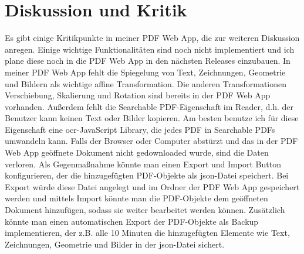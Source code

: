 \chapter{Diskussion und Kritik}
Es gibt einige Kritikpunkte in meiner PDF Web App, die zur weiteren Diskussion anregen. Einige wichtige Funktionalitäten sind noch nicht implementiert und ich plane diese noch in die PDF Web App in den nächsten Releases einzubauen. In meiner PDF Web App fehlt die Spiegelung von Text, Zeichnungen, Geometrie und Bildern als wichtige affine Transformation. Die anderen Transformationen Verschiebung, Skalierung und Rotation sind bereits in der PDF Web App vorhanden. Außerdem fehlt die Searchable PDF-Eigenschaft im Reader, d.h. der Benutzer kann keinen Text oder Bilder kopieren. Am besten benutze ich für diese Eigenschaft eine \gls{ocr}-JavaScript Library, die jedes PDF in Searchable PDFs umwandeln kann. Falls der Browser oder Computer abstürzt und das in der PDF Web App geöffnete Dokument nicht gedownloaded wurde, sind die Daten verloren. Als Gegenmaßnahme könnte man einen Export und Import Button konfigurieren, der die hinzugefügten PDF-Objekte als \gls{json}-Datei speichert. Bei Export würde diese Datei angelegt und im Ordner der PDF Web App gespeichert werden und mittels Import könnte man die PDF-Objekte dem geöffneten Dokument hinzufügen, sodass sie weiter bearbeitet werden können. Zusätzlich könnte man einen automatischen Export der PDF-Objekte als Backup implementieren, der z.B. alle 10 Minuten die hinzugefügten Elemente wie Text, Zeichnungen, Geometrie und Bilder in der \gls{json}-Datei sichert. \\
